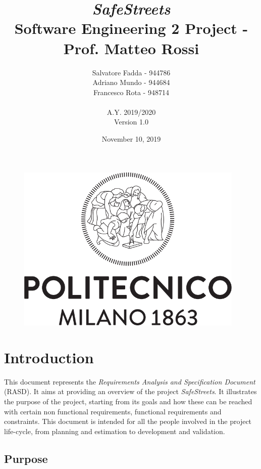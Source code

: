 \documentclass {article}
\begin{document}
\begin{figure}
\centering
	\includegraphics[height=8cm]{polimi_logo.png}
\end{figure}


\title {{\Huge \it SafeStreets} \\ \Large Software Engineering 2 Project - Prof. Matteo Rossi}
\author{Salvatore Fadda - 944786\\Adriano Mundo - 944684 \\ Francesco Rota - 948714
		\\ \\ A.Y. 2019/2020 \\ Version 1.0}
\date{November 10, 2019}



\maketitle
\newpage

	
\tableofcontents
\newpage


\section{Introduction}
This document represents the {\it Requirements Analysis and Specification Document} (RASD). It aims at providing an overview of the project {\it SafeStreets}. It illustrates the purpose of the project, starting from its goals and how these can be reached with certain non functional requirements, functional requirements and constraints. This document is intended for all the people involved in the project life-cycle, from planning and estimation to development and validation.

	
	\subsection{Purpose}
	
\end{document}
